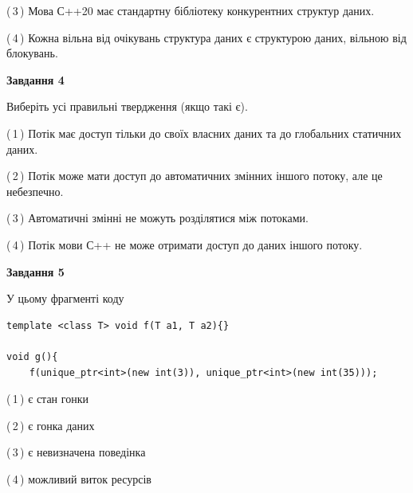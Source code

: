 \documentclass[12pt, ukrainian]{article}
\begin{document}
\begin {large}
{(\,3\,) Мова С++20 має стандартну бібліотеку конкурентних структур даних.%

(\,4\,) Кожна вільна від очікувань структура даних є структурою даних, вільною від блокувань.%



\begin{center}
\textbf{Завдання 4}
\end{center}
Виберіть усі правильні твердження (якщо такі є).\par
\vspace{2mm}

(\,1\,) Потік має доступ тільки до своїх власних даних та до глобальних статичних даних.%

(\,2\,) Потік може мати доступ до автоматичних змінних іншого потоку, але це небезпечно.%

(\,3\,) Автоматичні змінні не можуть розділятися між потоками.%

(\,4\,) Потік мови С++ не може отримати доступ до даних іншого потоку.%



\begin{center}
\textbf{Завдання 5}
\end{center}
У цьому фрагменті коду
\begin{verbatim}
template <class T> void f(T a1, T a2){}

void g(){
    f(unique_ptr<int>(new int(3)), unique_ptr<int>(new int(35)));
\end{verbatim}

(\,1\,) є стан гонки%

(\,2\,) є гонка даних%

(\,3\,) є невизначена поведінка%

(\,4\,) можливий виток ресурсів%


}
\end {large}
\end{document}
